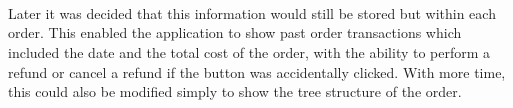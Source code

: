 \\ \\ \\
Later it was decided that this information would still be stored but within each order. This enabled the application to show past order transactions which included the date and the total cost of the order, with the ability to perform a refund or cancel a refund if the button was accidentally clicked. With more time, this could also be modified simply to show the tree structure of the order.